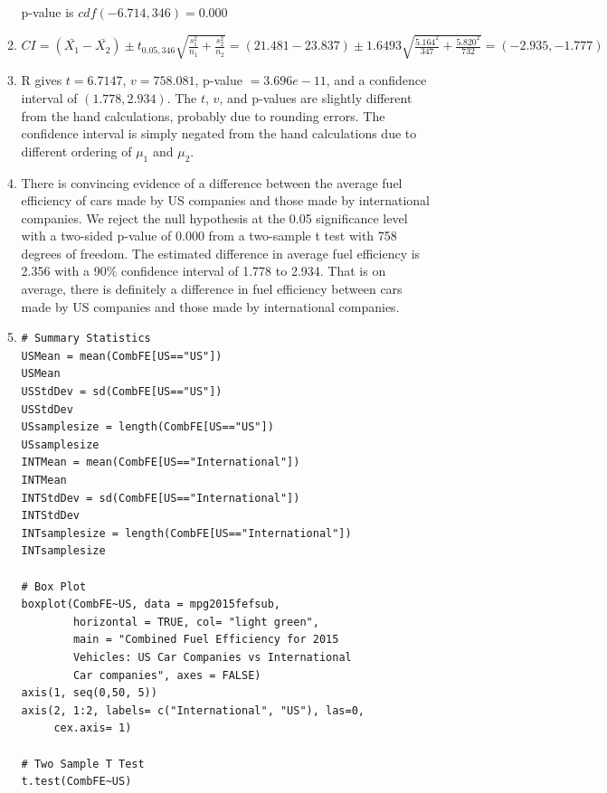 \documentclass[12pt,letterpaper]{article}
\begin{document}
\begin{enumerate}
\begin{enumerate}
        p-value is $cdf(-6.714, 346) = \boxed{0.000}$

      \item $CI = (\bar{X_1} - \bar{X_2}) \pm t_{0.05,346}\sqrt{\frac{s_1^2}{n_1}+\frac{s_2^2}{n_2}} = (21.481-23.837) \pm 1.6493\sqrt{\frac{5.164^2}{347}+\frac{5.820^2}{732}} = \boxed{(-2.935, -1.777)}$

      \item R gives $t = 6.7147$, $v = 758.081$, p-value $= 3.696e-11$, and
        a confidence interval of $(1.778, 2.934)$. The $t$, $v$, and p-values
        are slightly different from the hand calculations, probably due to
        rounding errors. The confidence interval is simply negated from the
        hand calculations due to different ordering of $\mu_1$ and $\mu_2$.

      \item There is convincing evidence of a difference between the average
        fuel efficiency of cars made by US companies and those made by
        international companies. We reject the null hypothesis at the 0.05
        significance level with a two-sided p-value of $0.000$ from
        a two-sample t test with 758 degrees of freedom. The estimated
        difference in average fuel efficiency is 2.356 with a 90\% confidence
        interval of 1.778 to 2.934. That is on average, there is definitely
        a difference in fuel efficiency between cars made by US companies and
        those made by international companies.

      \item
        \begin{verbatim}
# Summary Statistics
USMean = mean(CombFE[US=="US"])
USMean
USStdDev = sd(CombFE[US=="US"])
USStdDev 
USsamplesize = length(CombFE[US=="US"])
USsamplesize
INTMean = mean(CombFE[US=="International"])
INTMean
INTStdDev = sd(CombFE[US=="International"])
INTStdDev 
INTsamplesize = length(CombFE[US=="International"])
INTsamplesize

# Box Plot
boxplot(CombFE~US, data = mpg2015fefsub,
        horizontal = TRUE, col= "light green",
        main = "Combined Fuel Efficiency for 2015
        Vehicles: US Car Companies vs International
        Car companies", axes = FALSE)
axis(1, seq(0,50, 5))
axis(2, 1:2, labels= c("International", "US"), las=0,
     cex.axis= 1)

# Two Sample T Test
t.test(CombFE~US)
          \end{verbatim}
        \end{enumerate}


\end{enumerate}
\end{document}
